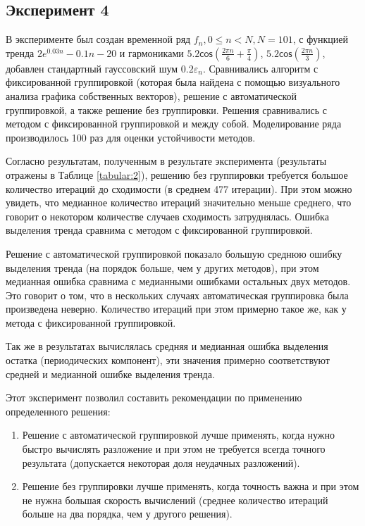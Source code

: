 \documentclass[specialist,
               substylefile = spbu_report.rtx,
               subf,href,colorlinks=true, 12pt]{disser}
\theoremstyle{definition}
\begin{document}
\subsection{Эксперимент 4}
В эксперименте был создан временной ряд $f_n , 0\leq n < N, N=101$, с функцией тренда $2e^{0.03n} - 0.1n - 20$ и гармониками $5.2\mathsf{cos}(\frac{2\pi n}{6} + \frac{\pi}{4})$, $5.2\mathsf{cos}(\frac{2 \pi n} {3})$, добавлен стандартный гауссовский шум $0.2 \varepsilon_n$.
Сравнивались алгоритм с фиксированной группировкой (которая была найдена с помощью визуального анализа графика собственных векторов), решение с автоматической группировкой, а также решение без группировки. Решения сравнивались с методом с фиксированной группировкой и между собой. Моделирование ряда производилось 100 раз для оценки устойчивости методов.

Согласно результатам, полученным в результате эксперимента (результаты отражены в Таблице \ref{tabular:2}), решению без группировки требуется большое количество итераций до сходимости (в среднем 477 итерации). При этом можно увидеть, что медианное количество итераций значительно меньше среднего, что говорит о некотором количестве случаев сходимость затруднялась. Ошибка выделения тренда сравнима с методом с фиксированной группировкой.

Решение с автоматической группировкой показало большую среднюю ошибку выделения тренда (на порядок больше, чем у других методов), при этом медианная ошибка сравнима с медианными ошибками остальных двух методов. Это говорит о том, что в нескольких случаях автоматическая группировка была произведена неверно. Количество итераций при этом примерно такое же, как у метода с фиксированной группировкой.

Так же в результатах вычислялась средняя и медианная ошибка выделения остатка (периодических компонент), эти значения примерно соответствуют средней и медианной ошибке выделения тренда.

Этот эксперимент позволил составить рекомендации по применению определенного решения:
\begin{enumerate}
    \item Решение с автоматической группировкой лучше применять, когда нужно быстро вычислять разложение и при этом не требуется всегда точного результата (допускается некоторая доля неудачных разложений).
    \item Решение без группировки лучше применять, когда точность важна и при этом не нужна большая скорость вычислений (среднее количество итераций больше на два порядка, чем у другого решения).
\end{enumerate}
\end{document}
